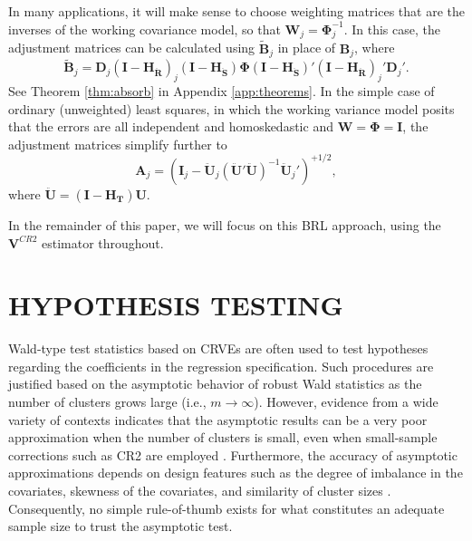 \documentclass[12pt]{article}\usepackage[]{graphicx}\usepackage[]{color}
\newcommand{\bm}{\mathbf}
\newcommand{\bs}{\boldsymbol}
\begin{document}
In many applications, it will make sense to choose weighting matrices that are the inverses of the working covariance model, so that $\bm{W}_j = \bs\Phi_j^{-1}$. In this case, the adjustment matrices can be calculated using $\bm{\tilde{B}}_j$ in place of $\bm{B}_j$, where
\begin{equation}
\label{eq:CR2_B_tilde}
\bm{\tilde{B}}_j = \bm{D}_j\left(\bm{I} - \bm{H_{\ddot{R}}}\right)_j \left(\bm{I} - \bm{H_{\ddot{S}}}\right) \bs\Phi \left(\bm{I} - \bm{H_{\ddot{S}}}\right)' \left(\bm{I} - \bm{H_{\ddot{R}}}\right)_j' \bm{D}_j'.
\end{equation}
See Theorem \ref{thm:absorb} in Appendix \ref{app:theorems}.
In the simple case of ordinary (unweighted) least squares, in which the working variance model posits that the errors are all independent and homoskedastic and $\bm{W} = \bs\Phi = \bm{I}$, the adjustment matrices simplify further to \[
\bm{A}_j = \left(\bm{I}_j - \bm{\ddot{U}}_j\left(\bm{\ddot{U}}'\bm{\ddot{U}}\right)^{-1}\bm{\ddot{U}}_j'\right)^{+1/2},\]
where $\bm{\ddot{U}} = \left(\bm{I} - \bm{H_T}\right)\bm{U}$.

In the remainder of this paper, we will focus on this BRL approach, using the $\bm{V}^{CR2}$ estimator throughout. 


\section{HYPOTHESIS TESTING}
\label{sec:testing}

Wald-type test statistics based on CRVEs are often used to test hypotheses regarding the coefficients in the regression specification. 
Such procedures are justified based on the asymptotic behavior of robust Wald statistics as the number of clusters grows large (i.e., $m \to \infty$). 
However, evidence from a wide variety of contexts indicates that the asymptotic results can be a very poor approximation when the number of clusters is small, even when small-sample corrections such as CR2 are employed \citep{Bell2002bias, Bertrand2004how, Cameron2008bootstrap}. 
Furthermore, the accuracy of asymptotic approximations depends on design features such as the degree of imbalance in the covariates, skewness of the covariates, and similarity of cluster sizes \citep{McCaffrey2001generalizations, Tipton2015small, Webb2013wild}. 
Consequently, no simple rule-of-thumb exists for what constitutes an adequate sample size to trust the asymptotic test. 
\end{document}
